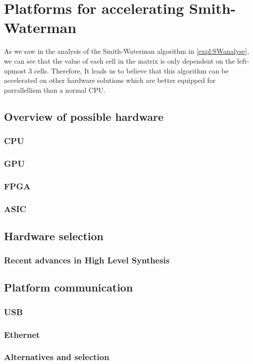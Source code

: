 
\chapter{Platforms for accelerating Smith-Waterman}
\label{ch:Platforms}

As we saw in the analysis of the Smith-Waterman algorithm in \ref{expl:SWanalyse}, we can see that the value of each cell in the matrix is only dependent on the left-upmost 3 cells. Therefore, It leads us to believe that this algorithm can be accelerated on other hardware solutions which are better equipped for parrallellism than a normal CPU.

\section{Overview of possible hardware}

\subsection{CPU}
\subsection{GPU}
\subsection{FPGA}
\subsection{ASIC}

\section{Hardware selection}

\subsection{Recent advances in High Level Synthesis}

\section{Platform communication}

\subsection{USB}
\subsection{Ethernet}
\subsection{Alternatives and selection}


